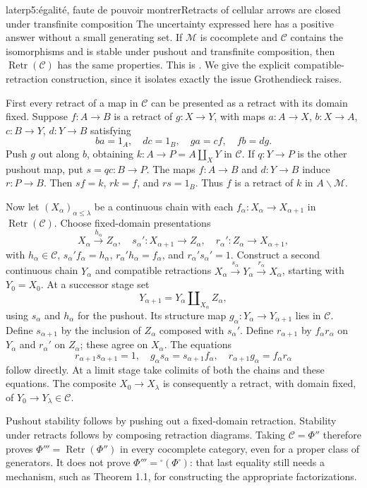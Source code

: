 \begin{dcomment}{later}{p5:égalité, faute de pouvoir montrer}{Retracts of cellular arrows are closed under transfinite composition}
The uncertainty expressed here has a positive answer without a small generating set. If $\mathcal M$ is cocomplete and $\mathcal C$ contains the isomorphisms and is stable under pushout and transfinite composition, then $\operatorname{Retr}(\mathcal C)$ has the same properties. This is \citet[Lemma~2.2]{MakkaiRosicky2014}. We give the explicit compatible-retraction construction, since it isolates exactly the issue Grothendieck raises.

First every retract of a map in $\mathcal C$ can be presented as a retract with its domain fixed. Suppose $f:A\to B$ is a retract of $g:X\to Y$, with maps $a:A\to X$, $b:X\to A$, $c:B\to Y$, $d:Y\to B$ satisfying
\[
ba=1_A,\quad dc=1_B,\quad ga=cf,\quad fb=dg.
\]
Push $g$ out along $b$, obtaining $k:A\to P=A\amalg_XY$ in $\mathcal C$. If $q:Y\to P$ is the other pushout map, put $s=qc:B\to P$. The maps $f:A\to B$ and $d:Y\to B$ induce $r:P\to B$. Then $sf=k$, $rk=f$, and $rs=1_B$. Thus $f$ is a retract of $k$ in $A\backslash\mathcal M$.

Now let $(X_\alpha)_{\alpha\leq\lambda}$ be a continuous chain with each $f_\alpha:X_\alpha\to X_{\alpha+1}$ in $\operatorname{Retr}(\mathcal C)$. Choose fixed-domain presentations
\[
 X_\alpha\xrightarrow{h_\alpha}Z_\alpha,
 \quad s_\alpha':X_{\alpha+1}\to Z_\alpha,
 \quad r_\alpha':Z_\alpha\to X_{\alpha+1},
\]
with $h_\alpha\in\mathcal C$, $s_\alpha'f_\alpha=h_\alpha$, $r_\alpha'h_\alpha=f_\alpha$, and $r_\alpha's_\alpha'=1$. Construct a second continuous chain $Y_\alpha$ and compatible retractions $X_\alpha\xrightarrow{s_\alpha}Y_\alpha\xrightarrow{r_\alpha}X_\alpha$, starting with $Y_0=X_0$. At a successor stage set
\[
Y_{\alpha+1}=Y_\alpha\amalg_{X_\alpha}Z_\alpha,
\]
using $s_\alpha$ and $h_\alpha$ for the pushout. Its structure map $g_\alpha:Y_\alpha\to Y_{\alpha+1}$ lies in $\mathcal C$. Define $s_{\alpha+1}$ by the inclusion of $Z_\alpha$ composed with $s_\alpha'$. Define $r_{\alpha+1}$ by $f_\alpha r_\alpha$ on $Y_\alpha$ and $r_\alpha'$ on $Z_\alpha$; these agree on $X_\alpha$. The equations
\[
r_{\alpha+1}s_{\alpha+1}=1,
\quad g_\alpha s_\alpha=s_{\alpha+1}f_\alpha,
\quad r_{\alpha+1}g_\alpha=f_\alpha r_\alpha
\]
follow directly. At a limit stage take colimits of both the chains and these equations. The composite $X_0\to X_\lambda$ is consequently a retract, with domain fixed, of $Y_0\to Y_\lambda\in\mathcal C$.

Pushout stability follows by pushing out a fixed-domain retraction. Stability under retracts follows by composing retraction diagrams. Taking $\mathcal C=\Phi''$ therefore proves $\Phi'''=\operatorname{Retr}(\Phi'')$ in every cocomplete category, even for a proper class of generators. It does not prove $\Phi'''={}^{\square}(\Phi^{\square})$: that last equality still needs a mechanism, such as Theorem 1.1, for constructing the appropriate factorizations.
\end{dcomment}

